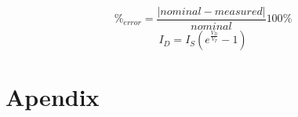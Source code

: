 \documentclass{article}
\begin{document}
\begin{equation}
  \%_{error} = \frac{|nominal - measured|}{nominal}100\%
  \label{eqn:percent_err}
\end{equation}
%
\begin{equation}
  I_D = I_S \left(e^{\frac{V_D}{V_T}} - 1\right)
  \label{eqn:schlockley}
\end{equation}

\section{Apendix}
\label{sec:appendix}
\end{document}
